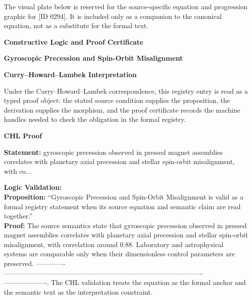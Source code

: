 \begingroup\footnotesize\sloppy
The visual plate below is reserved for the source-specific equation and progression graphic for [ID 0294]. It is included only as a companion to the canonical equation, not as a substitute for the formal text.
\par\endgroup
\ifTZPDarkEdition
{}
\fi

\clearpage
\begingroup\tzpsupportsetup
\noindent\textbf{\fontsize{10.8pt}{12.8pt}\selectfont [ID 0294] Constructive Logic and Proof Certificate}\par
\noindent\textbf{\fontsize{10pt}{12pt}\selectfont Gyroscopic Precession and Spin-Orbit Misalignment}\par
\vspace{0.45em}
\begingroup
\footnotesize
\setlength{\parskip}{0.22em}
\setlength{\parindent}{0pt}
\noindent\textbf{Curry--Howard--Lambek Interpretation}\par
Under the Curry--Howard--Lambek correspondence, this registry entry is read as a typed proof
object: the stated source condition supplies the proposition, the derivation supplies the
morphism, and the proof certificate records the machine handles needed to check the obligation
in the formal registry.

\vspace{0.45em}
\noindent\textbf{CHL Proof}\par
\textbf{Statement:} gyroscopic precession observed in pressed magnet assemblies correlates with planetary
axial precession and stellar spin-orbit misalignment, with co...

\textbf{Logic Validation:}\\
\textbf{Proposition:} ``Gyroscopic Precession and Spin-Orbit Misalignment is valid as a formal registry
statement when its source equation and semantic claim are read together.''\\
\textbf{Proof:} The source semantics state that gyroscopic precession observed in pressed magnet
assemblies correlates with planetary axial precession and stellar spin-orbit
misalignment, with correlation around 0.88. Laboratory and astrophysical systems are
comparable only when their dimensionless control parameters are preserved. -------------
----------------------------------------------------------------------------------------
-------------------. The CHL validation treats the equation as the formal anchor and the
semantic text as the interpretation constraint.

